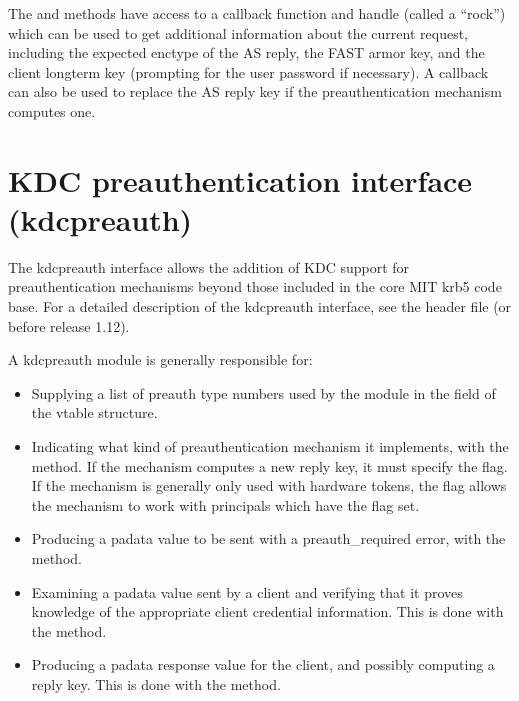 \documentclass[letterpaper,10pt,english]{sphinxmanual}
\begin{document}
\sphinxAtStartPar
The  and  methods have access to a callback
function and handle (called a “rock”) which can be used to get
additional information about the current request, including the
expected enctype of the AS reply, the FAST armor key, and the client
long\sphinxhyphen{}term key (prompting for the user password if necessary).  A
callback can also be used to replace the AS reply key if the
preauthentication mechanism computes one.

\sphinxstepscope


\section{KDC preauthentication interface (kdcpreauth)}
\label{\detokenize{plugindev/kdcpreauth:kdc-preauthentication-interface-kdcpreauth}}\label{\detokenize{plugindev/kdcpreauth::doc}}
\sphinxAtStartPar
The kdcpreauth interface allows the addition of KDC support for
preauthentication mechanisms beyond those included in the core MIT
krb5 code base.  For a detailed description of the kdcpreauth
interface, see the header file  (or
 before release 1.12).

\sphinxAtStartPar
A kdcpreauth module is generally responsible for:
\begin{itemize}
\item {} 
\sphinxAtStartPar
Supplying a list of preauth type numbers used by the module in the
 field of the vtable structure.

\item {} 
\sphinxAtStartPar
Indicating what kind of preauthentication mechanism it implements,
with the  method.  If the mechanism computes a new reply
key, it must specify the  flag.  If the mechanism
is generally only used with hardware tokens, the 
flag allows the mechanism to work with principals which have the
 flag set.

\item {} 
\sphinxAtStartPar
Producing a padata value to be sent with a preauth\_required error,
with the  method.

\item {} 
\sphinxAtStartPar
Examining a padata value sent by a client and verifying that it
proves knowledge of the appropriate client credential information.
This is done with the  method.

\item {} 
\sphinxAtStartPar
Producing a padata response value for the client, and possibly
computing a reply key.  This is done with the 
method.

\end{itemize}
\end{document}
